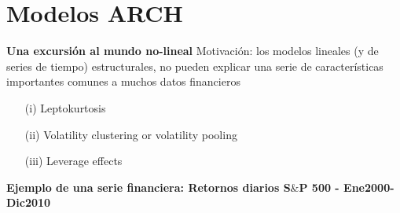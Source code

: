 
\section{Modelos ARCH}
\textbf{Una excursi\'on al mundo no-lineal}
		Motivación: los modelos lineales (y de series de tiempo)  estructurales, no pueden explicar una serie de características importantes comunes a muchos datos financieros
			\begin{itemize}
				\item[(i)] Leptokurtosis
				\item[(ii)] Volatility clustering or volatility pooling
				\item[(iii)] Leverage effects 
			\end{itemize}
%		
	\textbf{Ejemplo de una serie financiera: Retornos diarios S$\&$P 500 - Ene2000-Dic2010}
	
	\vspace{4mm}	
	
			
